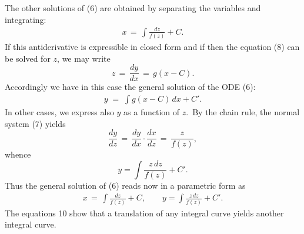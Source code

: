 \documentclass[12pt]{article}
\theoremstyle{definition}
\begin{document}
\begin{itemize}
The other solutions of (6) are obtained by separating the variables and integrating:
\begin{align}
x \,=\, \int\!\frac{dz}{f(z)}+C.
\end{align}
If this antiderivative is expressible in closed form and if then the equation (8) can be solved for $z$, we may write
$$z \,=\, \frac{dy}{dx} \,=\, g(x\!-\!C).$$
Accordingly we have in this case the general solution of the ODE (6):
\begin{align}
y \;=\; \int\!g(x\!-\!C)\,dx+C'.
\end{align}
In other cases, we express also $y$ as a function of $z$.\, By the chain rule, the normal system (7) yields
$$\frac{dy}{dz} \,=\, \frac{dy}{dx}\cdot\frac{dx}{dz} \,=\, \frac{z}{f(z)},$$
whence
$$y = \int\frac{z\,dz}{f(z)}+C'.$$
Thus the general solution of (6) reads now in a parametric form as
\begin{align}
x \,=\, \int\!\frac{dz}{f(z)}+C, \qquad y = \int\frac{z\,dz}{f(z)}+C'.
\end{align}
The equations 10 show that a translation of any integral curve yields another integral curve.

\end{itemize}


\end{document}
